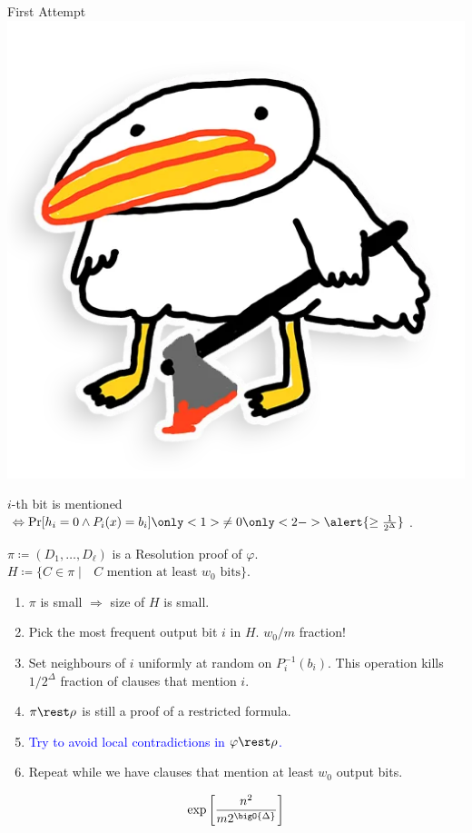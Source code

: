 \begin{frame}{First Attempt \hspace{0.2cm} \includegraphics[scale = 0.03]{pics/utia-blood.png}}

    $i$-th bit is mentioned $\Leftrightarrow \Pr[h_i = 0 \land P_i(x) = b_i] \only<1>{\neq
        0}\only<2->{\alert{\ge \frac{1}{2^{\Delta}}}}$.

    \pause
    \pause
    $\pi \coloneqq (D_1, \dots, D_{\ell})$ is a Resolution proof of $\varphi$. $H \coloneqq \{C \in \pi
    \mid \text{ $C$ mention at least $w_0$ bits} \}$.

    \begin{enumerate}
        \item $\pi$ is small $\Rightarrow$ size of $H$ is small.
        \pause
        \item Pick the most frequent output bit $i$ in $H$. \alert{$w_0 / m$ fraction!}
        \pause
        \item Set \alert{neighbours} of $i$ uniformly at random on $P_i^{-1}(b_i)$. This
            operation kills \alert{$1 / 2^{\Delta}$ fraction} of clauses that mention $i$.
        \pause
        \item $\pi \rest \rho$ is still a proof of a restricted formula.
        \pause
        \item \textcolor{blue}{Try to avoid local contradictions in $\varphi \rest \rho$.}
        \pause    
        \item Repeat while we have clauses that \alert{mention at least $w_0$ output bits}.
    \end{enumerate}

    
    $$\exp\left[\frac{n^2}{m 2^{\bigO{\Delta}}}\right]$$
    
\end{frame}


